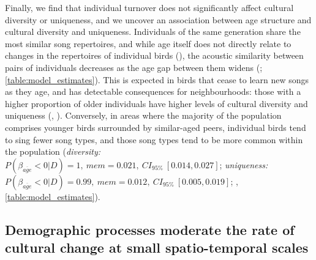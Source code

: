 \documentclass[9pt, onecolumn, twoside, lineno]{gsajnl}
\begin{document}
Finally, we find that individual turnover does not significantly affect cultural diversity or uniqueness, and we uncover an association between age structure and cultural diversity and uniqueness. Individuals of the same generation share the most similar song repertoires, and while age itself does not directly relate to changes in the repertoires of individual birds (), the acoustic similarity between pairs of individuals decreases as the age gap between them widens (; \autoref{table:model_estimates}). This is expected in birds that cease to learn new songs as they age, and has detectable consequences for neighbourhoods: those with a higher proportion of older individuals have higher levels of cultural diversity and uniqueness (, ). Conversely, in areas where the majority of the population comprises younger birds surrounded by similar-aged peers, individual birds tend to sing fewer song types, and those song types tend to be more common within the population (\textit{diversity:} $P(\beta_{\overline{age}} < 0 | D) = 1,~mem=0.021,~CI_{95\%}~[0.014, 0.027]$; \textit{uniqueness:} $P(\beta_{\overline{age}} < 0 | D) = 0.99,~mem=0.012,~CI_{95\%}~[0.005, 0.019]$; , \autoref{table:model_estimates}).

\subsection{Demographic processes moderate the rate of cultural change at small spatio-temporal scales}
\end{document}
